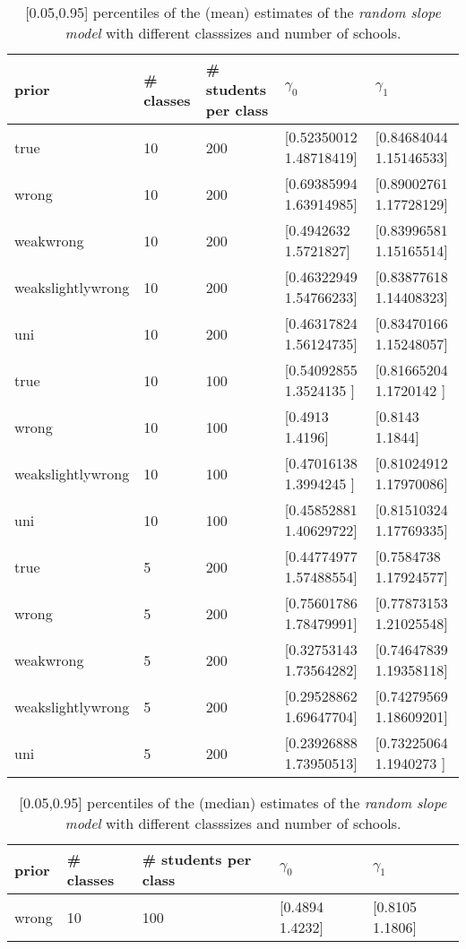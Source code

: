 \begin{table}[!ht]
\begin{center}
\begin{tabular}{l l l l  l}
prior & \# classes & \#  students per class &  $\gamma_0$ & $ \gamma_1$ \\
\hline
\hline
true & 10  &  200  &  [0.52350012 1.48718419]  &  [0.84684044 1.15146533]\\
wrong &10  &  200  &  [0.69385994 1.63914985]  &  [0.89002761 1.17728129]\\
weakwrong & 10  &  200  &  [0.4942632 1.5721827]  &  [0.83996581 1.15165514]\\
weakslightlywrong & 10  &  200  &  [0.46322949 1.54766233]  &  [0.83877618 1.14408323]\\
uni & 10  &  200  &  [0.46317824 1.56124735]  &  [0.83470166 1.15248057]\\
\hline
true &10  &  100  &  [0.54092855 1.3524135 ]  &  [0.81665204 1.1720142 ]\\
wrong &10  &  100  &  [0.4913 1.4196]  &  [0.8143 1.1844]\\
weakslightlywrong & 10  &  100  &  [0.47016138 1.3994245 ]  &  [0.81024912 1.17970086]\\
uni & 10  &  100  &  [0.45852881 1.40629722]  &  [0.81510324 1.17769335]\\
\hline
true & 5  &  200  &  [0.44774977 1.57488554]  &  [0.7584738  1.17924577]\\
wrong & 5  &  200  &  [0.75601786 1.78479991]  &  [0.77873153 1.21025548]\\
weakwrong & 5  &  200  &  [0.32753143 1.73564282]  &  [0.74647839 1.19358118]\\
weakslightlywrong &5  &  200  &  [0.29528862 1.69647704]  &  [0.74279569 1.18609201]\\
uni & 5  &  200  &  [0.23926888 1.73950513]  &  [0.73225064 1.1940273 ]\\
\end{tabular}
\end{center}
\caption{ [0.05,0.95] percentiles of the (mean) estimates of the  \emph{random slope model}  with different classsizes and number of schools. }
\label{tab:relational_table}
\end{table}

\begin{table}[!ht]
\begin{center}
\begin{tabular}{l l l l  l}
prior & \# classes & \#  students per class &  $\gamma_0$ & $ \gamma_1$ \\
\hline
\hline
wrong &10  &  100  &  [0.4894 1.4232]  &  [0.8105 1.1806]\\
\hline
\end{tabular}
\end{center}
\caption{ [0.05,0.95] percentiles of the (median) estimates of the  \emph{random slope model}  with different classsizes and number of schools. }
\label{tab:relational_table}
\end{table}


